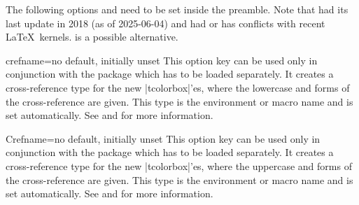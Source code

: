 \clearpage
\begin{marker}
The following options  and 
need to be set inside the preamble.
Note that  had its last update in 2018 (as of 2025-06-04) and
had or has conflicts with recent \LaTeX\ kernels.  is
a possible alternative.
\end{marker}

\begin{newTcbKey}[][doc updated=2014-12-01]{crefname}{=}{no default, initially unset}
  This option key can be used only in conjunction with the  package
  \cite{cubitt:2018a} which has to be loaded separately.
  It creates a cross-reference type for the new |tcolorbox|'es, where the
  lowercase  and  forms of the cross-reference are given.
  This type is the environment or macro name and  is set automatically.
  See  and \cite{cubitt:2018a} for more information.
\end{newTcbKey}


\begin{newTcbKey}[][doc updated=2014-12-01]{Crefname}{=}{no default, initially unset}
  This option key can be used only in conjunction with the  package
  \cite{cubitt:2018a} which has to be loaded separately.
  It creates a cross-reference type for the new |tcolorbox|'es, where the
  uppercase  and  forms of the cross-reference are given.
  This type is the environment or macro name and  is set automatically.
  See  and \cite{cubitt:2018a} for more information.
\end{newTcbKey}

